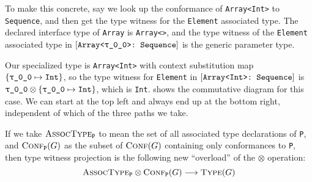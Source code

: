 \documentclass[../generics]{subfiles}
\begin{document}
\begin{example}
To make this concrete, say we look up the conformance of \texttt{Array<Int>} to \texttt{Sequence}, and then get the type witness for the \texttt{Element} associated type. The declared interface type of \texttt{Array} is \texttt{Array<>}, and the type witness of the \texttt{Element} associated type in $[\texttt{Array<\texttt{$\uptau$\_0\_0}>:~Sequence}]$ is the  generic parameter type.

Our specialized type is \texttt{Array<Int>} with context substitution map $\{\texttt{\texttt{$\uptau$\_0\_0}} \mapsto \texttt{Int}\}$, so the type witness for \texttt{Element} in $[\texttt{Array<Int>:~Sequence}]$ is $\texttt{$\uptau$\_0\_0}\otimes\{\texttt{\texttt{$\uptau$\_0\_0}} \mapsto \texttt{Int}\}$, which is \texttt{Int}.  shows the commutative diagram for this case. We can start at the top left and always end up at the bottom right, independent of which of the three paths we take.
\begin{figure}\label{type witness diagram example}
\begin{center}
\end{center}
\end{figure}
\end{example}

If we take $\textsc{AssocType}_{\texttt{P}}$ to mean the set of all associated type declarations of \texttt{P}, and $\textsc{Conf}_{\texttt{P}}({G})$ as the subset of $\textsc{Conf}({G})$ containing only conformances to \texttt{P}, then type witness projection is the following new ``overload'' of the \index{$\otimes$}$\otimes$ operation:
\[\textsc{AssocType}_{\texttt{P}}\otimes\textsc{Conf}_{\texttt{P}}({G})\longrightarrow\textsc{Type}({G})\]
\end{document}
